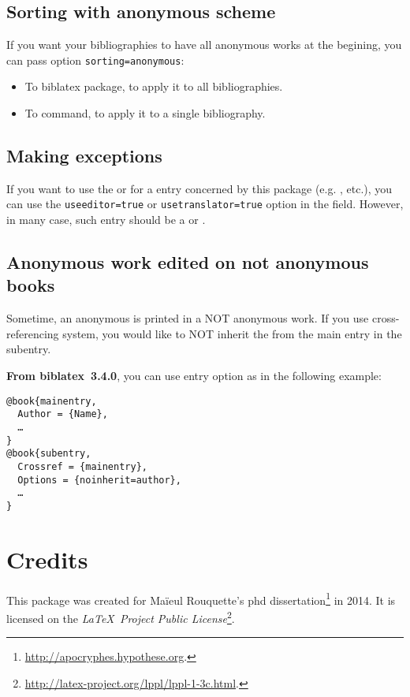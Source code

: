 \documentclass{ltxdockit}[2011/03/25]
\newcommand{\biblatex}{biblatex\xspace}
\begin{document}
\subsection{Sorting with anonymous scheme}

If you want your bibliographies to have all anonymous works at the begining, you can pass option \verb+sorting=anonymous+:

\begin{itemize}
	\item To \biblatex package, to apply it to all bibliographies.
	\item To  command, to apply it to a single bibliography.
\end{itemize}
\subsection{Making exceptions}

If you want to use the  or  for a entry concerned by this package (e.g. ,  etc.), you can use the \verb+useeditor=true+ or \verb+usetranslator=true+ 
option in the  field. However, in many case, such entry should be a  or . 

\subsection{Anonymous work edited on not anonymous books}\label{noinherit}

Sometime, an anonymous  is printed in a NOT anonymous work.
If you use cross-referencing system, you would like to NOT inherit the  from the main entry in the subentry.

\textbf{From \biblatex~3.4.0}, you can use entry option  as in the following example:

\begin{verbatim}
@book{mainentry,
  Author = {Name},
  …
}
@book{subentry,
  Crossref = {mainentry},
  Options = {noinherit=author},
  …
}
\end{verbatim}
\section{Credits}

This package was created for Maïeul Rouquette's phd dissertation\footnote{\url{http://apocryphes.hypothese.org}.} in 2014. It is licensed on the \emph{\LaTeX\ Project Public License}\footnote{\url{http://latex-project.org/lppl/lppl-1-3c.html}.}. 
\end{document}
